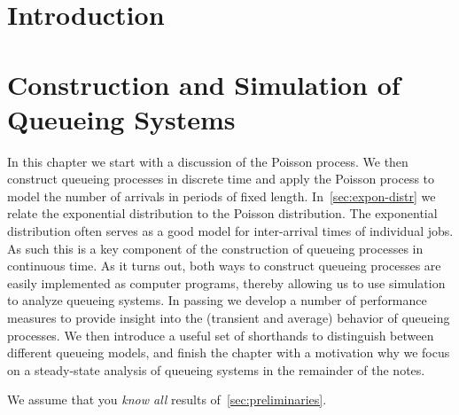 \author{Nicky D. van  Foreest}


\frontmatter
\maketitle

\tableofcontents

\chapter{Introduction}\label{sec:introduction}



\mainmatter

\chapter{Construction and Simulation of Queueing Systems}
\label{cha:single-stat-queu}

In this chapter we start with a discussion of the Poisson process.
We then construct queueing processes in discrete time and apply the Poisson process to model the number of arrivals in periods of fixed length.
In~\cref{sec:expon-distr} we relate the exponential distribution to the Poisson distribution.
The exponential distribution often serves as a good model for inter-arrival times of individual jobs.
As such this is a key component of the construction of queueing processes in continuous time.
As it turns out, both ways to construct queueing processes are easily implemented as computer programs, thereby allowing us to use simulation to analyze queueing systems.
In passing we develop a number of performance measures to provide insight into the (transient and average) behavior of queueing processes.
We then introduce a useful set of shorthands to distinguish between different queueing models, and finish the chapter with a motivation why we focus on a steady-state analysis of queueing systems in the remainder of the notes.

We assume that you  \emph{know all} results of~\cref{sec:preliminaries}. 











